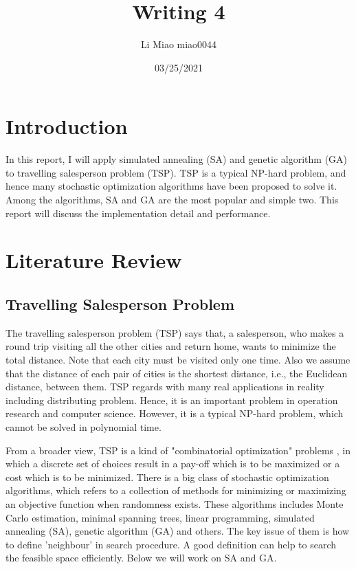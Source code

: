 \documentclass{article}
\title{Writing 4}
\author{Li Miao   miao0044}
\date{03/25/2021}
\begin{document}
\maketitle

\section{Introduction}
	 In this report, I will apply simulated annealing (SA) and genetic algorithm (GA) to travelling salesperson problem (TSP). TSP is a typical NP-hard problem, and hence many stochastic optimization algorithms have been proposed to solve it. Among the algorithms, SA and GA are the most popular and simple two. This report will discuss the implementation detail and performance.

\section{Literature Review}

	\subsection{Travelling Salesperson Problem}
	The travelling salesperson problem (TSP) says that, a salesperson, who makes a round trip visiting all the other cities  and return home, wants to minimize the total distance. Note that each city must be visited only one time. Also we assume that the distance of each pair of cities is the shortest distance, i.e., the Euclidean distance, between them. TSP regards with many real applications in reality including distributing problem\cite{ref1}. Hence, it is an important problem in operation research and computer science. However, it is a typical NP-hard problem, which cannot be solved in polynomial time.

	 From a broader view, TSP is a kind of "combinatorial optimization" problems \cite{ref2}, in which a discrete set of choices result in a pay-off which is to be maximized or a cost which is to be minimized.  There is a big class of  stochastic optimization algorithms\cite{ref3},  which refers to a collection of methods for minimizing or maximizing an objective function when randomness exists. These algorithms includes Monte Carlo estimation, minimal spanning trees, linear programming, simulated annealing (SA), genetic algorithm (GA)  and others. The key issue of them is how to define 'neighbour' in search procedure. A good definition can help to search the feasible space efficiently. Below we will work on SA and GA.
\end{document}
